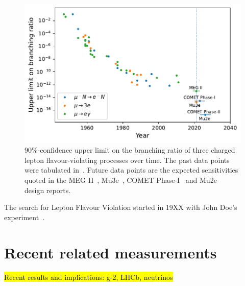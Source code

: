 \begin{figure}
    \centering
    \includegraphics{chapter1/clfv_upper_limit.pdf}
    \caption{90\%-confidence upper limit on the branching ratio of three charged lepton flavour-violating processes over time. The past data points were tabulated in~\cite{BERNSTEIN201327}. Future data points are the expected sensitivities quoted in the MEG II~\cite{Baldini2018}, Mu3e~\cite{ARNDT2021165679}, COMET Phase-I~\cite{the_comet_collaboration_comet_2020} and Mu2e~\cite{bartoszek2015mu2e} design reports.}
    \label{fig:clfv_upper_limit}
\end{figure}

The search for Lepton Flavour Violation started in 19XX with John Doe's experiment~\cite{doe}.

\section{Recent related measurements}
\hl{Recent results and implications: g-2, LHCb, neutrinos}

\cite{PhysRevLett.126.141801} %

\cite{lhcbcollaboration2021test} %


%
%
%
%
